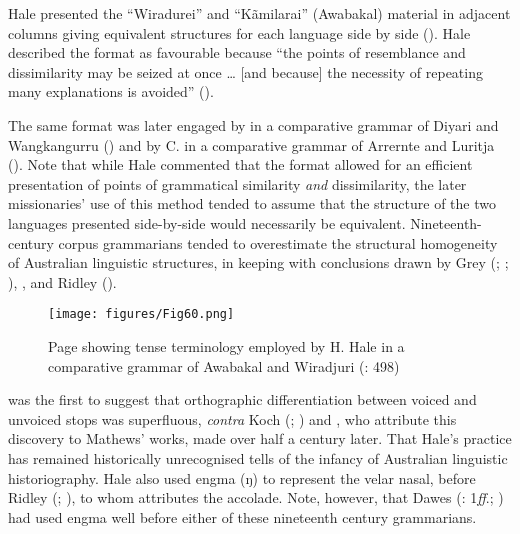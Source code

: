 Hale presented the “Wiradurei” and “Kãmilarai” (Awabakal) material in adjacent columns giving equivalent structures for each language side by side (). Hale described the format as favourable because “the points of resemblance and dissimilarity may be seized at once … [and because] the necessity of repeating many explanations is avoided” (\citealt[484]{hale_languages_1846}). 

The same format was later engaged by \citet{flierl_christianieli_1880} in a comparative grammar of Diyari and Wangkangurru () and by C. \citet{strehlow_notitle_1910} in a comparative grammar of Arrernte and Luritja (). Note that while Hale commented that the format allowed for an efficient presentation of points of grammatical similarity \textit{and} dissimilarity, the later missionaries' use of this method tended to assume that the structure of the two languages presented side-by-side would necessarily be equivalent. Nineteenth-century corpus grammarians tended to overestimate the structural homogeneity of Australian linguistic structures, in keeping with conclusions drawn by Grey (\citeyear{grey_languages_1845}; ; ), \citet[v-vi]{moorhouse_vocabulary_1846}, and Ridley (\citeyear[293]{ridley_kamilaroi_1856}).

\begin{figure}
\texttt{[image: figures/Fig60.png]}
\caption{Page showing tense terminology employed by H. Hale in a comparative grammar of Awabakal and Wiradjuri (\citeyear{hale_languages_1846}: 498)}
\label{fig:key:4-60}
\end{figure} 

\citet[485]{hale_languages_1846} was the first to suggest that orthographic differentiation between voiced and unvoiced stops was superfluous, \textit{contra} Koch (\citeyear[154]{koch_explaining_2011}; \citeyear[184]{koch_r_2008}) and \citet{blake_nineteenth-century_2016}, who attribute this discovery to Mathews' works, made over half a century later. That Hale’s practice has remained historically unrecognised tells of the infancy of Australian linguistic historiography. Hale also used engma (ŋ) to represent the velar nasal, before Ridley (\citeyear{ridley_kamilaroi_1855}; ), to whom \citet[41]{austin_gamilaraay_2008} attributes the accolade. Note, however, that Dawes (\citeyear{dawes_grammatical_1790}: 1\textit{ff}.; \citeyear{dawes_vocabulary_1790}) had used engma well before either of these nineteenth century grammarians.

